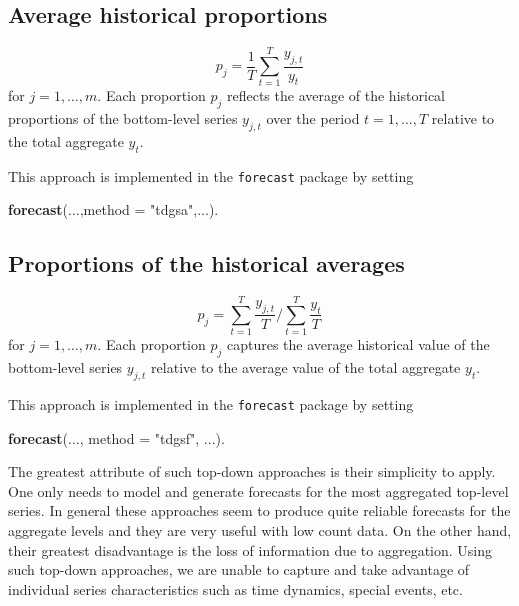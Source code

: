 \documentclass[]{book}
\newenvironment{Shaded}{\begin{snugshade}}{\end{snugshade}}
\newcommand{\DataTypeTok}[1]{\textcolor[rgb]{0.13,0.29,0.53}{#1}}
\newcommand{\KeywordTok}[1]{\textcolor[rgb]{0.13,0.29,0.53}{\textbf{#1}}}
\newcommand{\NormalTok}[1]{#1}
\newcommand{\StringTok}[1]{\textcolor[rgb]{0.31,0.60,0.02}{#1}}
\begin{document}
\hypertarget{average-historical-proportions}{%
\subsection*{Average historical proportions}\label{average-historical-proportions}}

\[
  p_j=\frac{1}{T}\sum_{t=1}^{T}\frac{y_{j,t}}{{y_t}}
\]
for \(j=1,\dots,m\). Each proportion \(p_j\) reflects the average of the historical proportions of the bottom-level series \(y_{j,t}\) over the period \(t=1,\dots,T\) relative to the total aggregate \(y_t\).

This approach is implemented in the \texttt{forecast} package by setting

\begin{Shaded}
\begin{Highlighting}[]
\KeywordTok{forecast}\NormalTok{(...,}\DataTypeTok{method =} \StringTok{"tdgsa"}\NormalTok{,...). }
\end{Highlighting}
\end{Shaded}

\hypertarget{proportions-of-the-historical-averages}{%
\subsection*{Proportions of the historical averages}\label{proportions-of-the-historical-averages}}

\[
  p_j={\sum_{t=1}^{T}\frac{y_{j,t}}{T}}\Big/{\sum_{t=1}^{T}\frac{y_t}{T}}
\]
for \(j=1,\dots,m\). Each proportion \(p_j\) captures the average historical value of the bottom-level series \(y_{j,t}\) relative to the average value of the total aggregate \(y_t\).

This approach is implemented in the \texttt{forecast} package by setting

\begin{Shaded}
\begin{Highlighting}[]
\KeywordTok{forecast}\NormalTok{(..., }\DataTypeTok{method =} \StringTok{"tdgsf"}\NormalTok{, ...). }
\end{Highlighting}
\end{Shaded}

The greatest attribute of such top-down approaches is their simplicity to apply. One only needs to model and generate forecasts for the most aggregated top-level series. In general these approaches seem to produce quite reliable forecasts for the aggregate levels and they are very useful with low count data. On the other hand, their greatest disadvantage is the loss of information due to aggregation. Using such top-down approaches, we are unable to capture and take advantage of individual series characteristics such as time dynamics, special events, etc.
\end{document}
